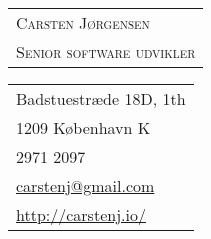 \documentclass[10pt, a4paper]{article}
\begin{document}
\begin{minipage}[t][2cm][t]{.5\textwidth}
\begin{tabular}{@{}l@{}} %
\\
{\Huge\scshape Carsten Jørgensen} \\[2.35ex]
{\LARGE\scshape Senior software udvikler}
\end{tabular}
\end{minipage}
\hfill
\begin{minipage}[t][2cm][t]{.4\textwidth}
\hfill
\begin{tabular}{l}
Badstuestræde 18D, 1th \\
1209 København K \\[1ex]
2971 2097 \\
\href{mailto:carstenj@gmail.com}{carstenj@gmail.com} \\
\href{http://carstenj.io/}{http://carstenj.io/}
\end{tabular}
\end{minipage}

\end{document}
